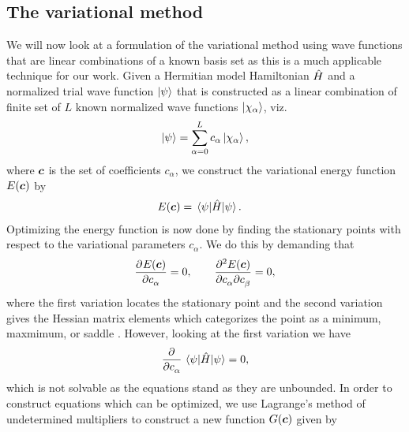         \subsection{The variational method}
            \label{subsec:variational-method}
            We will now look at a formulation of the variational method using
            wave functions that are linear combinations of a known basis set as
            this is a much applicable technique for our work.
            Given a Hermitian model Hamiltonian $\hat{H}$ and a normalized trial
            wave function $\ket{\psi}$ that is constructed as a linear
            combination of finite set of $L$ known normalized wave functions
            $\ket{\chi_{\alpha}}$, viz.
            \begin{align}
                \ket{\psi} = \sum_{\alpha = 0}^{L} c_{\alpha}\ket{\chi_{\alpha}},
            \end{align}
            where $\boldsymbol{c}$ is the set of coefficients $c_{\alpha}$, we
            construct the variational energy function $E(\boldsymbol{c})$ by
            \begin{align}
                E(\boldsymbol{c})
                &= \mel{\psi}{\hat{H}}{\psi}.
            \end{align}
            Optimizing the energy function is now done by finding the
            stationary points with respect to the variational parameters
            $c_{\alpha}$.
            We do this by demanding that
            \begin{gather}
                \dpd[]{E(\vfg{c})}{c_{\alpha}} = 0,
				\qquad
                \dmd{E(\vfg{c})}{2}{c_{\alpha}}{}{c_{\beta}}{} = 0,
            \end{gather}
            where the first variation locates the stationary point and the
            second variation gives the Hessian matrix elements which categorizes
            the point as a minimum, maxmimum, or saddle
            \cite{helgaker-molecular}.
            However, looking at the first variation we have
            \begin{align}
                \dpd{}{c_{\alpha}}\mel*{\psi}{\hamil}{\psi} = 0,
            \end{align}
            which is not solvable as the equations stand \cite{szabo1996modern}
            as they are unbounded.
            In order to construct equations which can be optimized, we use
            Lagrange's method of undetermined multipliers to construct a new
            function $G(\boldsymbol{c})$ given by \cite{helgaker-molecular,
            szabo1996modern}
